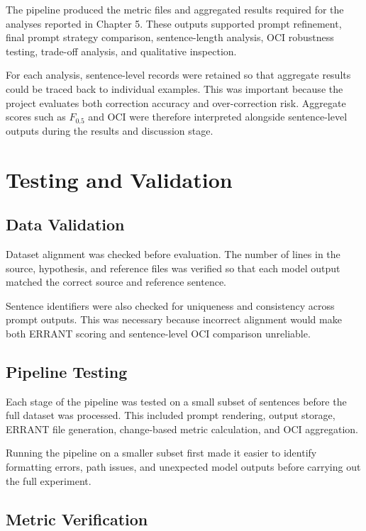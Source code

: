 The pipeline produced the metric files and aggregated results required for the analyses reported in Chapter 5. These outputs supported prompt refinement, final prompt strategy comparison, sentence-length analysis, OCI robustness testing, trade-off analysis, and qualitative inspection.

For each analysis, sentence-level records were retained so that aggregate results could be traced back to individual examples. This was important because the project evaluates both correction accuracy and over-correction risk. Aggregate scores such as $F_{0.5}$ and OCI were therefore interpreted alongside sentence-level outputs during the results and discussion stage.

\section{Testing and Validation}

\subsection{Data Validation}

Dataset alignment was checked before evaluation. The number of lines in the source, hypothesis, and reference files was verified so that each model output matched the correct source and reference sentence.

Sentence identifiers were also checked for uniqueness and consistency across prompt outputs. This was necessary because incorrect alignment would make both ERRANT scoring and sentence-level OCI comparison unreliable.

\subsection{Pipeline Testing}

Each stage of the pipeline was tested on a small subset of sentences before the full dataset was processed. This included prompt rendering, output storage, ERRANT file generation, change-based metric calculation, and OCI aggregation.

Running the pipeline on a smaller subset first made it easier to identify formatting errors, path issues, and unexpected model outputs before carrying out the full experiment.

\subsection{Metric Verification}

